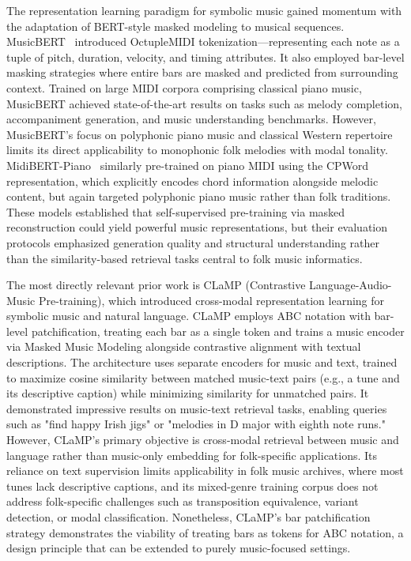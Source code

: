 \documentclass[]{interact}
\theoremstyle{plain}
\theoremstyle{definition}
\theoremstyle{remark}
\begin{document}
The representation learning paradigm for symbolic music gained momentum with the adaptation of BERT-style masked modeling to musical sequences. MusicBERT~\cite{MusicBERT2022} introduced OctupleMIDI tokenization—representing each note as a tuple of pitch, duration, velocity, and timing attributes. It also employed bar-level masking strategies where entire bars are masked and predicted from surrounding context. Trained on large MIDI corpora comprising classical piano music, MusicBERT achieved state-of-the-art results on tasks such as melody completion, accompaniment generation, and music understanding benchmarks. However, MusicBERT's focus on polyphonic piano music and classical Western repertoire limits its direct applicability to monophonic folk melodies with modal tonality. MidiBERT-Piano~\cite{MidiBERT2021} similarly pre-trained on piano MIDI using the CPWord representation, which explicitly encodes chord information alongside melodic content, but again targeted polyphonic piano music rather than folk traditions. These models established that self-supervised pre-training via masked reconstruction could yield powerful music representations, but their evaluation protocols emphasized generation quality and structural understanding rather than the similarity-based retrieval tasks central to folk music informatics.

The most directly relevant prior work is CLaMP (Contrastive Language-Audio-Music Pre-training)\cite{CLaMP2023}, which introduced cross-modal representation learning for symbolic music and natural language. CLaMP employs ABC notation with bar-level patchification, treating each bar as a single token and trains a music encoder via Masked Music Modeling alongside contrastive alignment with textual descriptions. The architecture uses separate encoders for music and text, trained to maximize cosine similarity between matched music-text pairs (e.g., a tune and its descriptive caption) while minimizing similarity for unmatched pairs. It demonstrated impressive results on music-text retrieval tasks, enabling queries such as "find happy Irish jigs" or "melodies in D major with eighth note runs." However, CLaMP's primary objective is cross-modal retrieval between music and language rather than music-only embedding for folk-specific applications. Its reliance on text supervision limits applicability in folk music archives, where most tunes lack descriptive captions, and its mixed-genre training corpus does not address folk-specific challenges such as transposition equivalence, variant detection, or modal classification. Nonetheless, CLaMP's bar patchification strategy demonstrates the viability of treating bars as tokens for ABC notation, a design principle that can be extended to purely music-focused settings.
\end{document}
